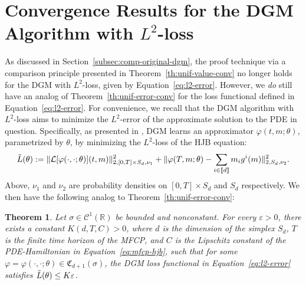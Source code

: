 \documentclass[11pt,reqno]{amsart}
\numberwithin{equation}{section}
\theoremstyle{plain}
\newtheorem{theorem}{Theorem}[section]
\newcommand{\R}{\mathbb{R}}
\newcommand{\sC}{\mathcal{C}}
\newcommand{\sL}{\mathcal{L}}
\newcommand{\lbrs}[1]{\llbracket #1 \rrbracket}
\begin{document}
\section{Convergence Results for the DGM Algorithm with $L^2$-loss}
\label{app:a}
As discussed in Section~\ref{subsec:comp-original-dgm}, the proof technique via a comparison principle presented in Theorem~\ref{th:unif-value-conv} no longer holds for the DGM with $L^2$-loss, given by Equation~\eqref{eq:l2-error}. However, we \textit{do} still have an analog of Theorem~\ref{th:unif-error-conv} for the loss functional defined in Equation~\eqref{eq:l2-error}. For convenience, we recall that the DGM algorithm with $L^2$-loss aims to minimize the $L^2$-error of the approximate solution to the PDE in question. Specifically, as presented in \cite{dgm}, DGM learns an approximator $\varphi(t, m; \theta)$, parametrized by $\theta$, by minimizing the $L^2$-loss of the HJB equation:
\begin{align*}
    \Tilde{L}(\theta) := \|\sL[\varphi(\cdot, \cdot; \theta)](t,m)\|_{2, [0, T] \times S_d, \nu_1}^2 + \|\varphi(T, m; \theta) - \sum_{i \in \lbrs{d}} m_i g^i(m)\|_{2, S_d, \nu_2}^2.
\end{align*}
Above, $\nu_1$ and $\nu_2$ are probability densities on $[0, T] \times S_d$ and $S_d$ respectively. We then have the following analog to Theorem~\ref{th:unif-error-conv}:
\begin{theorem}
\label{th:l2-error-conv}
Let $\sigma \in \sC^1(\R)$ be bounded and nonconstant. For every $\varepsilon > 0$, there exists a constant $K(d, T, C) > 0$, where $d$ is the dimension of the simplex $S_d$, $T$ is the finite time horizon of the MFCP, and $C$ is the Lipschitz constant of the PDE-Hamiltonian in Equation~\eqref{eq:mfcp-hjb}, such that for some $\varphi=\varphi(\cdot,\cdot;\theta) \in \mathfrak{C}_{d+1}(\sigma)$, the DGM loss functional in Equation~\eqref{eq:l2-error} satisfies $\Tilde{L}(\theta) \leq K \varepsilon$.
\end{theorem}
\end{document}
